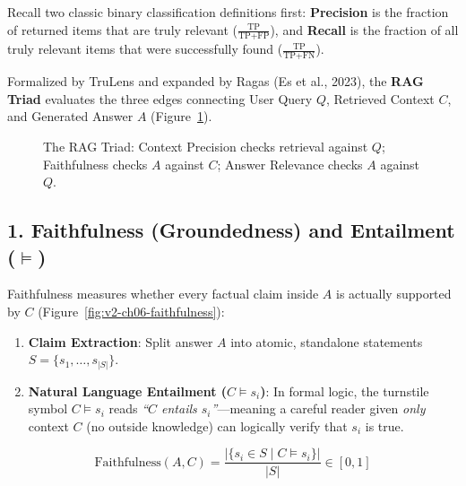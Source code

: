 Recall two classic binary classification definitions first: \textbf{Precision} is the fraction of returned items that are truly relevant ($\frac{\text{TP}}{\text{TP}+\text{FP}}$), and \textbf{Recall} is the fraction of all truly relevant items that were successfully found ($\frac{\text{TP}}{\text{TP}+\text{FN}}$).

Formalized by TruLens and expanded by Ragas (Es et al., 2023), the \textbf{RAG Triad} evaluates the three edges connecting User Query $Q$, Retrieved Context $C$, and Generated Answer $A$ (Figure~\ref{fig:v2-ch06-triad}).

\begin{figure}[htbp]
\centering
{}
\caption{The RAG Triad: Context Precision checks retrieval against $Q$; Faithfulness checks $A$ against $C$; Answer Relevance checks $A$ against $Q$.}
\label{fig:v2-ch06-triad}
\end{figure}

\subsection{1. Faithfulness (Groundedness) and Entailment ($\models$)}
Faithfulness measures whether every factual claim inside $A$ is actually supported by $C$ (Figure~\ref{fig:v2-ch06-faithfulness}):
\begin{enumerate}[leftmargin=18pt]
  \item \textbf{Claim Extraction}: Split answer $A$ into atomic, standalone statements $S = \{s_1, \dots, s_{|S|}\}$.
  \item \textbf{Natural Language Entailment ($C \models s_i$)}: In formal logic, the turnstile symbol $C \models s_i$ reads \emph{``$C$ entails $s_i$''}—meaning a careful reader given \emph{only} context $C$ (no outside knowledge) can logically verify that $s_i$ is true.
\end{enumerate}
\begin{equation}
\text{Faithfulness}(A, C) = \frac{|\{s_i \in S \mid C \models s_i\}|}{|S|} \in [0, 1]
\end{equation}

